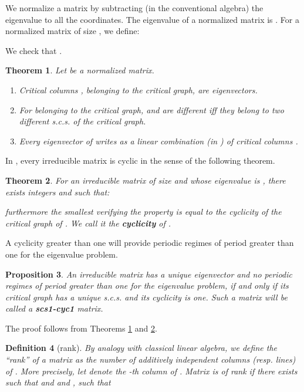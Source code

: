\documentclass[11pt,titlepage]{article}
\newtheorem{theo}{Theorem }[section]
\newtheorem{prop}[theo]{Proposition }
\newtheorem{defi}[theo]{Definition }
\begin{document}
We normalize a matrix by subtracting (in the
conventional algebra) the eigenvalue to all the coordinates. 
The eigenvalue of a
normalized matrix is .
For a normalized matrix  of size , we define:

We check that .
\begin{theo}
Let  be a normalized matrix. 
\begin{enumerate}
\item[a.] Critical columns ,  belonging to the critical graph,
are eigenvectors.
\item[b.] For  belonging to the critical graph,  and
 are different iff  
they belong to two different s.c.s. of the critical graph.
\item[c.] Every eigenvector of  writes as a linear
combination (in ) of critical columns
.
\end{enumerate}
\label{vectprop}
\end{theo}

In , every irreducible matrix is cyclic in the sense of the following
theorem.
\begin{theo}
For an irreducible matrix  of size  and whose eigenvalue is ,
there 
exists integers  and  such that:

furthermore the smallest  verifying the property is equal to the cyclicity
of the 
critical graph of . We call it the {\bf cyclicity} of . \\
\label{thcyc}
\end{theo}

A cyclicity greater than one will provide periodic regimes of period greater than
one for the eigenvalue problem.

\begin{prop}
An irreducible matrix has a unique eigenvector and no periodic regimes of period greater than
one for the eigenvalue problem, if and only if its critical graph has a unique s.c.s. and its cyclicity is one. Such a matrix will be called a
{\bf scs1-cyc1} matrix.
\label{pr:scscyc}
\end{prop}

The proof follows from Theorems \ref{vectprop} and \ref{thcyc}. 


\begin{defi}[rank]
\label{de:rank1}
By analogy with 
classical linear algebra, we define 
the ``rank'' of a matrix  as the number of additively
independent columns (resp. lines) of . More precisely, 
let   denote the -th column  of .
Matrix  is of rank  if there exists 
such that  and  and
, such that

\end{defi}
\end{document}
